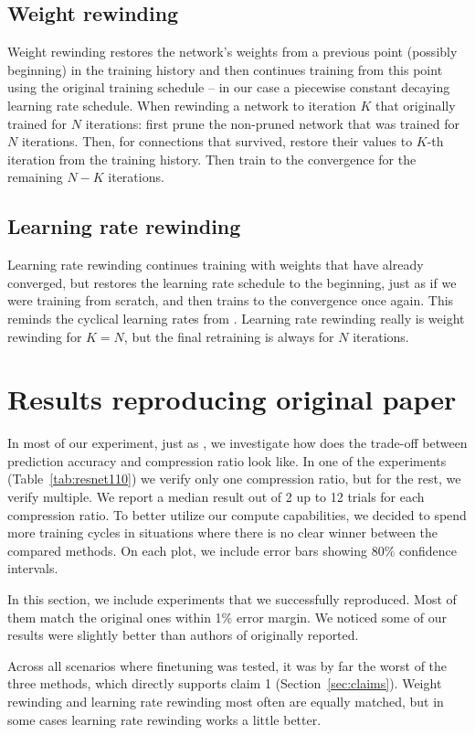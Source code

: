 \subsection{Weight rewinding}
Weight rewinding restores the network's weights from a previous point (possibly beginning) in the training history and then continues training from this point using the original training schedule -- in our case a piecewise constant decaying learning rate schedule.
When rewinding a network to iteration $K$ that originally trained for $N$ iterations: first prune the non-pruned network that was trained for $N$ iterations. Then, for connections that survived, restore their values to $K$-th iteration from the training history. Then train to the convergence for the remaining $N-K$ iterations.

\subsection{Learning rate rewinding}
Learning rate rewinding continues training with weights that have already converged, but restores the learning rate schedule to the beginning, just as if we were training from scratch, and then trains to the convergence once again. This reminds the cyclical learning rates from \cite{cyclical}. Learning rate rewinding really is weight rewinding for $K = N$, but the final retraining is always for $N$ iterations.

\section{Results reproducing original paper}
In most of our experiment, just as \cite{Renda}, we investigate how does the trade-off between prediction accuracy and compression ratio look like. 
In one of the experiments (Table~\ref{tab:resnet110}) we verify only one compression ratio, but for the rest, we verify multiple.
We report a median result out of 2 up to 12 trials for each compression ratio. To better utilize our compute capabilities, we decided to spend more training cycles in situations where there is no clear winner between the compared methods. On each plot, we include error bars showing 80\% confidence intervals.

In this section, we include experiments that we successfully reproduced.
Most of them match the original ones within 1\% error margin.
We noticed some of our results were slightly better than authors of \cite{Renda} originally reported.


Across all scenarios where finetuning was tested, it was by far the worst of the three methods, which directly supports claim 1 (Section~\ref{sec:claims}). Weight rewinding and learning rate rewinding most often are equally matched, but in some cases learning rate rewinding works a little better.


